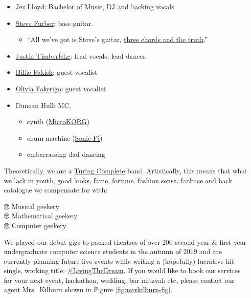\documentclass[
  12pt,
]{book}
\providecommand{\tightlist}{%
  \setlength{\itemsep}{0pt}\setlength{\parskip}{0pt}}
\begin{document}
\begin{itemize}
\tightlist
\item
  \href{https://www.linkedin.com/in/jez-lloyd-84077069}{Jez Lloyd}: Bachelor of Music, DJ and backing vocals
\item
  \href{https://en.wikipedia.org/wiki/Steve_Furber}{Steve Furber}: bass guitar.

  \begin{itemize}
  \tightlist
  \item
    ``All we've got is Steve's guitar, \href{https://en.wikipedia.org/wiki/Three_Chords_and_the_Truth}{three chords and the truth}.'' \citep{harlan, allalongthewatchtower}
  \end{itemize}
\item
  \href{https://en.wikipedia.org/wiki/Justin_Timberlake}{Justin Timberfake}: lead vocals, lead dancer \citep{cantstopthefeeling}
\item
  \href{https://en.wikipedia.org/wiki/Billie_Eilish}{Billie Fakish}: guest vocalist \citep{badguy}
\item
  \href{https://en.wikipedia.org/wiki/Olivia_Rodrigo}{Olivia Fakerigo}: guest vocalist \citep{good4u}
\item
  Duncan Hull: MC,

  \begin{itemize}
  \tightlist
  \item
    synth (\href{https://en.wikipedia.org/wiki/MicroKORG}{MicroKORG})
  \item
    drum machine (\href{https://sonic-pi.net/}{Sonic Pi})
  \item
    embarrassing dad dancing \citep{daddancing}
  \end{itemize}
\end{itemize}

Theoretically, we are a \href{https://en.wikipedia.org/wiki/Turing_completeness}{Turing Complete} band. \citep{Turing1937, turingcomplete} Artistically, this means that what we lack in youth, good looks, fame, fortune, fashion sense, fanbase and back catalogue we compensate for with:

🤓 Musical geekery \citep{musicnmaths, behindthemusic}\\
🤓 Mathematical geekery \citep{plusmaths}\\
🤓 Computer geekery \citep{Aaron2016}

We played our debut gigs to packed theatres of over 200 second year \& first year undergraduate computer science students in the autumn of 2019 and are currently planning future live events while writing a (hopefully) lucrative hit single, working title: \href{https://twitter.com/hashtag/LivingTheDream}{\#LivingTheDream}. If you would like to book our services for your next event, hackathon, wedding, bar mitzvah etc, please contact our agent Mrs.~Kilburn shown in Figure \ref{fig:mrskilburn-fig}.
\end{document}

